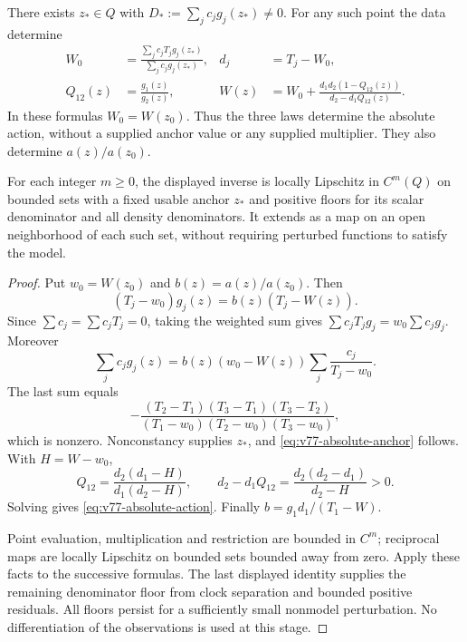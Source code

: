 \begin{theorem}
\label{thm:v77-clock}
There exists $z_*\in Q$ with $D_*:=\sum_jc_jg_j(z_*)\ne0$.
For any such point the data determine
\begin{align}
 W_0&=\frac{\sum_jc_jT_jg_j(z_*)}{\sum_jc_jg_j(z_*)},
       &d_j&=T_j-W_0,\label{eq:v77-absolute-anchor}\\
 Q_{12}(z)&=\frac{g_1(z)}{g_2(z)},
       &W(z)&=W_0+
       \frac{d_1d_2(1-Q_{12}(z))}{d_2-d_1Q_{12}(z)}.
       \label{eq:v77-absolute-action}
\end{align}
In these formulas $W_0=W(z_0)$.  Thus the three laws determine the
absolute action, without a supplied anchor value or any supplied
multiplier.  They also determine $a(z)/a(z_0)$.

For each integer $m\ge0$, the displayed inverse is locally Lipschitz
in $C^m(Q)$ on bounded sets with a fixed usable anchor $z_*$ and
positive floors for its scalar denominator and all density denominators.
It extends as a map on an open neighborhood of each such set, without
requiring perturbed functions to satisfy the model.
\end{theorem}
\begin{proof}
Put $w_0=W(z_0)$ and $b(z)=a(z)/a(z_0)$.  Then
\begin{equation}\label{eq:v77-affine}
 (T_j-w_0)g_j(z)=b(z)(T_j-W(z)).
\end{equation}
Since $\sum c_j=\sum c_jT_j=0$, taking the weighted sum gives
$\sum c_jT_jg_j=w_0\sum c_jg_j$.  Moreover
\[
 \sum_jc_jg_j(z)
 =b(z)(w_0-W(z))\sum_j\frac{c_j}{T_j-w_0}.
\]
The last sum equals
\[
 -\frac{(T_2-T_1)(T_3-T_1)(T_3-T_2)}
 {(T_1-w_0)(T_2-w_0)(T_3-w_0)},
\]
which is nonzero.  Nonconstancy supplies $z_*$, and
\eqref{eq:v77-absolute-anchor} follows.  With $H=W-w_0$,
\[
 Q_{12}=\frac{d_2(d_1-H)}{d_1(d_2-H)},\qquad
 d_2-d_1Q_{12}=\frac{d_2(d_2-d_1)}{d_2-H}>0.
\]
Solving gives \eqref{eq:v77-absolute-action}.  Finally
$b=g_1d_1/(T_1-W)$.

Point evaluation, multiplication and restriction are bounded in $C^m$;
reciprocal maps are locally Lipschitz on bounded sets bounded away from
zero.  Apply these facts to the successive formulas.  The last displayed
identity supplies the remaining denominator floor from clock separation
and bounded positive residuals.  All floors persist for a sufficiently
small nonmodel perturbation.  No differentiation of the observations is
used at this stage.
\end{proof}

